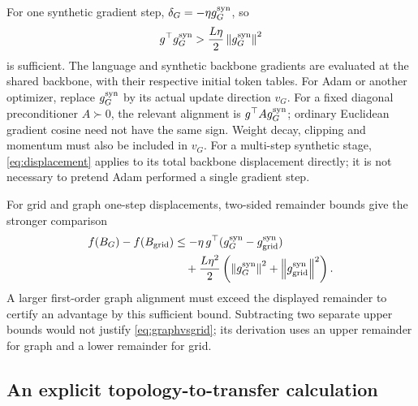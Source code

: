 For one synthetic gradient step, $\delta_G=-\eta g_G^{\rm syn}$, so
\begin{equation}
 g^\top g_G^{\rm syn}>
       \frac{L\eta}{2}\left\lVert g_G^{\rm syn}\right\rVert^2
 \label{eq:singlealignment}
\end{equation}
is sufficient. The language and synthetic backbone gradients are
evaluated at the shared backbone, with their respective initial token
tables. For Adam or another optimizer, replace $g_G^{\rm syn}$ by its
actual update direction $v_G$. For a fixed diagonal preconditioner
$A\succ0$, the relevant alignment is $g^\top A g_G^{\rm syn}$;
ordinary Euclidean gradient cosine need not have the same sign.
Weight decay, clipping and momentum must also be included in $v_G$.
For a multi-step synthetic stage, \eqref{eq:displacement} applies to its
total backbone displacement directly; it is not necessary to pretend
Adam performed a single gradient step.

For grid and graph one-step displacements, two-sided remainder bounds
give the stronger comparison
\begin{align}
 f(B_G)-f(B_{\rm grid})
 &\leq-\eta\,g^\top
           (g_G^{\rm syn}-g_{\rm grid}^{\rm syn})\\
 &\quad+\frac{L\eta^2}{2}
       \left(\left\lVert g_G^{\rm syn}\right\rVert^2+
             \left\lVert g_{\rm grid}^{\rm syn}\right\rVert^2\right).
 \label{eq:graphvsgrid}
\end{align}
A larger first-order graph alignment must exceed the displayed
remainder to certify an advantage by this sufficient bound.
Subtracting two separate upper bounds would not justify
\eqref{eq:graphvsgrid}; its derivation uses an upper remainder for graph
and a lower remainder for grid.

\subsection{An explicit topology-to-transfer calculation}

